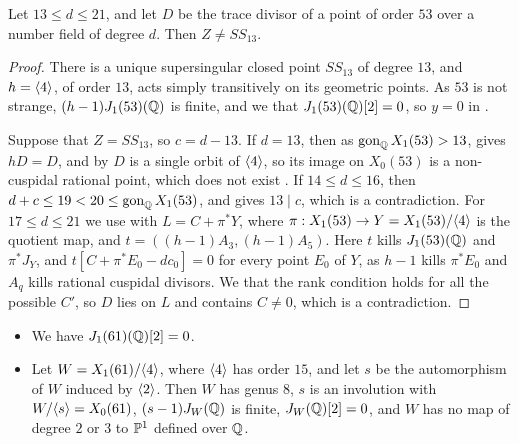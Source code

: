 \begin{proposition}\label{prop:53}
Let $13\leq d\leq 21$, and let $D$ be the trace divisor of a point of order $53$ over a number field of degree $d$. Then $Z\neq SS_{13}$.
\end{proposition}

\begin{proof}
There is a unique supersingular closed point $SS_{13}$ of degree $13$, and $h=\langle 4\rangle$, of order $13$, acts simply transitively on its geometric points. As $53$ is not strange, $(h-1)J_1(53)(\mathbb{Q})$ is finite, and we  that $J_1(53)(\mathbb{Q})[2]=0$, so $y=0$ in .

Suppose that $Z=SS_{13}$, so $c=d-13$. If $d=13$, then as $\operatorname{gon}_{\mathbb{Q}} X_1(53)>13$,  gives $hD=D$, and by  $D$ is a single orbit of $\langle 4\rangle$, so its image on $X_0(53)$ is a non-cuspidal rational point, which does not exist \cite[Theorem 1]{mazur78}. If $14\leq d\leq 16$, then $d+c\leq 19<20\leq\operatorname{gon}_{\mathbb{Q}} X_1(53)$, and  gives $13\mid c$, which is a contradiction. For $17\leq d\leq 21$ we use  with $L=C+\pi^*Y$, where $\pi:X_1(53)\to Y=X_1(53)/\langle 4\rangle$ is the quotient map, and $t=((h-1)A_3,(h-1)A_5)$. Here $t$ kills $J_1(53)(\mathbb{Q})$ and $\pi^*J_Y$, and $t[C+\pi^*E_0-dc_0]=0$ for every point $E_0$ of $Y$, as $h-1$ kills $\pi^*E_0$ and $A_q$ kills rational cuspidal divisors. We  that the rank condition holds for all the possible $C'$, so $D$ lies on $L$ and contains $C\neq0$, which is a contradiction.
\end{proof}

\begin{lemma}\label{lem:W61}
\begin{itemize}
\item[a)] We have $J_1(61)(\mathbb{Q})[2]=0$.
\item[b)] Let $W=X_1(61)/\langle 4\rangle$, where $\langle 4\rangle$ has order $15$, and let $s$ be the automorphism of $W$ induced by $\langle 2\rangle$. Then $W$ has genus $8$, $s$ is an involution with $W/\langle s\rangle=X_0(61)$, $(s-1)J_W(\mathbb{Q})$ is finite, $J_W(\mathbb{Q})[2]=0$, and $W$ has no map of degree $2$ or $3$ to $\mathbb{P}^1$ defined over $\mathbb{Q}$.
\end{itemize}
\end{lemma}

